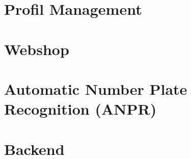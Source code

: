 \section{Profil Management}

\section{Webshop}


\section{Automatic Number Plate Recognition (ANPR)}


\section{Backend}



